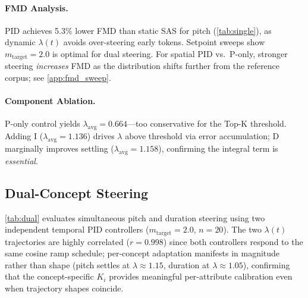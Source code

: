 \documentclass{article}
\theoremstyle{plain}
\begin{document}
\paragraph{FMD Analysis.}
PID achieves 5.3\% lower FMD than static SAS for pitch (\cref{tab:single}), as dynamic $\lambda(t)$ avoids over-steering early tokens. Setpoint sweeps show $m_\text{target}{=}2.0$ is optimal for dual steering. For spatial PID vs.\ P-only, stronger steering \emph{increases} FMD as the distribution shifts further from the reference corpus; see \cref{app:fmd_sweep}.


\paragraph{Component Ablation.}
\label{sec:ablation}
P-only control yields $\lambda_\text{avg}{=}0.664$---too conservative for the Top-K threshold. Adding I ($\lambda_\text{avg}{=}1.136$) drives $\lambda$ above threshold via error accumulation; D marginally improves settling ($\lambda_\text{avg}{=}1.158$), confirming the integral term is \emph{essential}.



\subsection{Dual-Concept Steering}
\label{sec:dual}

\cref{tab:dual} evaluates simultaneous pitch and duration steering using two independent temporal PID controllers ($m_\text{target}{=}2.0$, $n{=}20$). The two $\lambda(t)$ trajectories are highly correlated ($r{=}0.998$) since both controllers respond to the same cosine ramp schedule; per-concept adaptation manifests in magnitude rather than shape (pitch settles at $\lambda{\approx}1.15$, duration at $\lambda{\approx}1.05$), confirming that the concept-specific $K_i$ provides meaningful per-attribute calibration even when trajectory shapes coincide.
\end{document}
